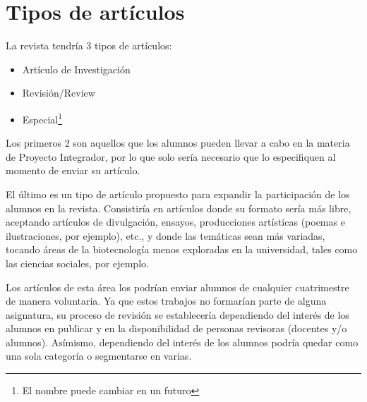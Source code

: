 \section{Tipos de artículos}

La revista tendría 3 tipos de artículos:

\begin{itemize}
    \item Artículo de Investigación
    \item Revisión/Review
    \item Especial\footnote{El nombre puede cambiar en un futuro}
\end{itemize}

Los primeros 2 son aquellos que los alumnos pueden llevar a cabo en la materia de Proyecto Integrador, por lo que solo sería necesario que lo especifiquen al momento de enviar su artículo.

El último es un tipo de artículo propuesto para expandir la participación de los alumnos en la revista. Consistiría en artículos donde su formato sería más libre, aceptando artículos de divulgación, ensayos, producciones artísticas (poemas e ilustraciones, por ejemplo), etc., y donde las temáticas sean más variadas, tocando áreas de la biotecnología menos exploradas en la universidad, tales como las ciencias sociales, por ejemplo.

Los artículos de esta área los podrían enviar alumnos de cualquier cuatrimestre de manera voluntaria. Ya que estos trabajos no formarían parte de alguna asignatura, su proceso de revisión se establecería dependiendo del interés de los alumnos en publicar y en la disponibilidad de personas revisoras (docentes y/o alumnos). Asímismo, dependiendo del interés de los alumnos podría quedar como una sola categoría o segmentarse en varias. 